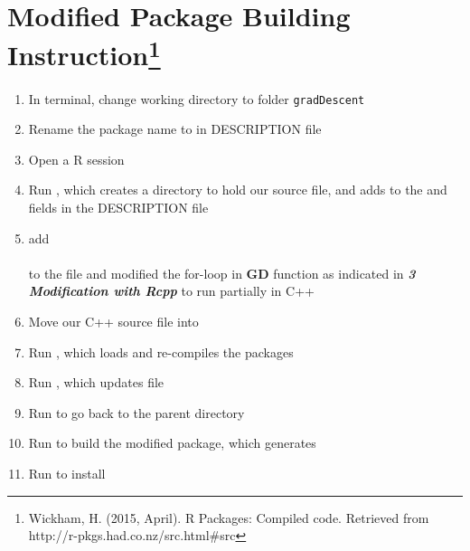 \documentclass[12pt, letterpaper]{article} %
\begin{document}
\vspace*{-12mm}
\section{Modified Package Building Instruction\footnote{Wickham, H. (2015, April). R Packages: Compiled code. Retrieved from http://r-pkgs.had.co.nz/src.html#src}}
\vspace*{-5mm}
\begin{enumerate}
    \item In terminal, change working directory to folder \texttt{gradDescent}
    \item Rename the package name to  in DESCRIPTION file
    \item Open a R session
    \item Run  , which creates a  directory to hold our  source file, and adds  to the  and  fields in the DESCRIPTION file
    \item add 
    \vspace{0.7em}\\
    \vspace{0.7em}\\
    to the  file and modified the for-loop in \textbf{GD} function as indicated in \textit{\textbf{3 Modification with Rcpp}}  to run partially in C++
    \item Move our C++ source file  into 
    \item Run  , which loads and re-compiles the packages
    \item Run  , which updates  file
    \item Run  to go back to the parent directory
    \item Run  to build the modified package, which generates\\
    \item Run  to install
\end{enumerate}
\end{document}
